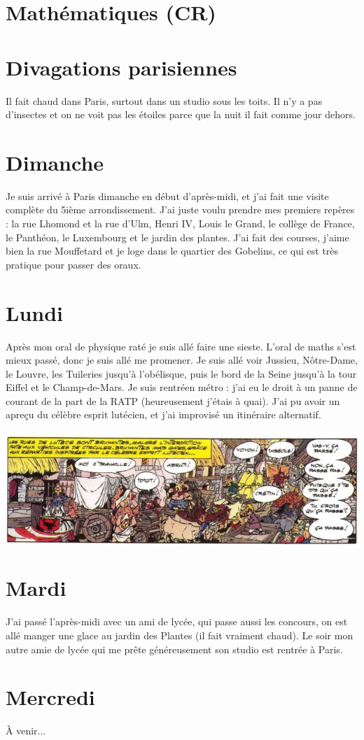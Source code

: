 \documentclass[french,a4paper, 12pt]{article}
\begin{document}
\section*{Mathématiques (CR)}

\section*{Divagations parisiennes}

Il fait chaud dans Paris, surtout dans un studio sous les toits. Il n'y a pas d'insectes et on ne voit pas les étoiles parce que la nuit il fait comme jour dehors.

\section*{Dimanche}

Je suis arrivé à Paris dimanche en début d'après-midi, et j'ai fait une visite complète du 5ième arrondissement. J'ai juste voulu prendre mes premiers repères : la rue Lhomond et la rue d'Ulm, Henri IV, Louis le Grand, le collège de France, le Panthéon, le Luxembourg et le jardin des plantes. J'ai fait des courses, j'aime bien la rue Mouffetard et je loge dans le quartier des Gobelins, ce qui est très pratique pour passer des oraux.

\section*{Lundi}

Après mon oral de physique raté je suis allé faire une sieste. L'oral de maths s'est mieux passé, donc je suis allé me promener. Je suis allé voir Jussieu, Nôtre-Dame, le Louvre, les Tuileries jusqu'à l'obélisque, puis le bord de la Seine jusqu'à la tour Eiffel et le Champ-de-Mars. Je suis rentréen métro : j'ai eu le droit à un panne de courant de la part de la RATP (heureusement j'étais à quai). J'ai pu avoir un apreçu du célèbre esprit lutécien, et j'ai improvisé un itinéraire alternatif.

\includegraphics[scale=0.65]{asterix.jpg}

\section*{Mardi}

J'ai passé l'après-midi avec un ami de lycée, qui passe aussi les concours, on est allé manger une glace au jardin des Plantes (il fait vraiment chaud). Le soir mon autre amie de lycée qui me prête généreusement son studio est rentrée à Paris.

\section*{Mercredi}

À venir...
\end{document}

